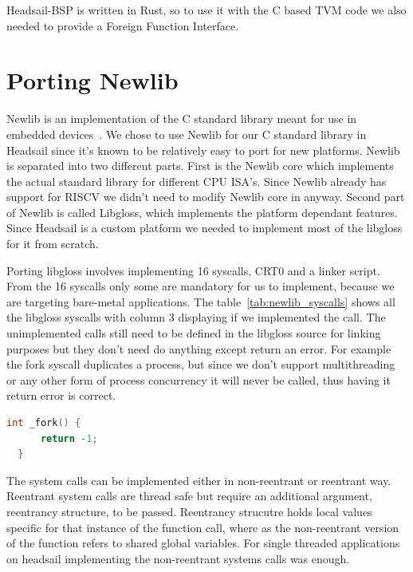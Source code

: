 \documentclass[12pt,a4paper,english
]{tunithesis}
\begin{document}
Headsail-BSP is written in Rust, so to use it with the C based TVM code we also needed to provide a Foreign Function Interface.


\section{Porting Newlib}
Newlib is an implementation of the C standard library meant for use in embedded devices~\parencite{newlib}. We chose to use Newlib for our C standard library in Headsail since it's known to be relatively easy to port for new platforms. Newlib is separated into two different parts. First is the Newlib core which implements the actual standard library for different CPU ISA's. Since Newlib already has support for RISCV we didn't need to modify Newlib core in anyway. Second part of Newlib is called Libgloss, which implements the platform dependant features. Since Headsail is a custom platform we needed to implement most of the libgloss for it from scratch.

Porting libgloss involves implementing 16 syscalls, CRT0 and a linker script. From the 16 syscalls only some are mandatory for us to implement, because we are targeting bare-metal applications. The table~\ref{tab:newlib_syscalls} shows all the libgloss syscalls with column 3 displaying if we implemented the call. The unimplemented calls still need to be defined in the libgloss source for linking purposes but they don't need do anything except return an error. For example the fork syscall duplicates a process, but since we don't support multithreading or any other form of process concurrency it will never be called, thus having it return error is correct.

\begin{lstlisting}[language=C, caption={Minimal implmentation of the fork() syscall in Newlib Libgloss}]
  int _fork() {
      return -1;
  }
\end{lstlisting}

The system calls can be implemented either in non-reentrant or reentrant way. Reentrant system calls are thread safe but require an additional argument, reentrancy structure, to be passed. Reentrancy strucutre holds local values specific for that instance of the function call, where as the non-reentrant version of the function refers to shared global variables. For single threaded applications on headsail implementing the non-reentrant systems calls was enough.~\parencite{bennett2010porting}
\end{document}
